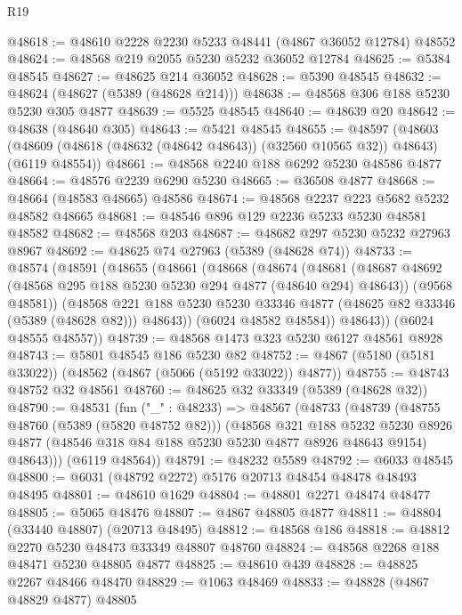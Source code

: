 \begin{lexlean}{R19}
\begin{coremodule}
@48618 := @48610 @2228 @2230 @5233 @48441 (@4867 @36052 @12784) @48552
@48624 := @48568 @219 @2055 @5230 @5232 @36052 @12784
@48625 := @5384 @48545
@48627 := @48625 @214 @36052
@48628 := @5390 @48545
@48632 := @48624 (@48627 (@5389 (@48628 @214)))
@48638 := @48568 @306 @188 @5230 @5230 @305 @4877
@48639 := @5525 @48545
@48640 := @48639 @20
@48642 := @48638 (@48640 @305)
@48643 := @5421 @48545
@48655 := @48597
    (@48603 (@48609 (@48618 (@48632 (@48642 @48643)) (@32560 @10565 @32)) @48643) (@6119 @48554))
@48661 := @48568 @2240 @188 @6292 @5230 @48586 @4877
@48664 := @48576 @2239 @6290 @5230
@48665 := @36508 @4877
@48668 := @48664 (@48583 @48665) @48586
@48674 := @48568 @2237 @223 @5682 @5232 @48582 @48665
@48681 := @48546 @896 @129 @2236 @5233 @5230 @48581 @48582
@48682 := @48568 @203
@48687 := @48682 @297 @5230 @5232 @27963 @8967
@48692 := @48625 @74 @27963 (@5389 (@48628 @74))
@48733 := @48574
    (@48591
      (@48655
        (@48661
          (@48668
            (@48674
              (@48681
                (@48687 @48692 (@48568 @295 @188 @5230 @5230 @294 @4877 (@48640 @294) @48643))
                (@9568 @48581))
              (@48568
                @221
                @188
                @5230
                @5230
                @33346
                @4877
                (@48625 @82 @33346 (@5389 (@48628 @82)))
                @48643))
            (@6024 @48582 @48584))
          @48643))
      (@6024 @48555 @48557))
@48739 := @48568 @1473 @323 @5230 @6127 @48561 @8928
@48743 := @5801 @48545 @186 @5230 @82
@48752 := @4867 (@5180 (@5181 @33022)) (@48562 (@4867 (@5066 (@5192 @33022)) @4877))
@48755 := @48743 @48752 @32 @48561
@48760 := @48625 @32 @33349 (@5389 (@48628 @32))
@48790 := @48531
    (fun ("_" : @48233) =>
    @48567
      (@48733
        (@48739
          (@48755 @48760 (@5389 (@5820 @48752 @82)))
          (@48568
            @321
            @188
            @5232
            @5230
            @8926
            @4877
            (@48546 @318 @84 @188 @5230 @5230 @4877 @8926 @48643 @9154)
            @48643)))
      (@6119 @48564))
@48791 := @48232 @5589
@48792 := @6033 @48545
@48800 := @6031 (@48792 @2272) @5176 @20713 @48454 @48478 @48493 @48495
@48801 := @48610 @1629
@48804 := @48801 @2271 @48474 @48477
@48805 := @5065 @48476
@48807 := @4867 @48805 @4877
@48811 := @48804 (@33440 @48807) (@20713 @48495)
@48812 := @48568 @186
@48818 := @48812 @2270 @5230 @48473 @33349 @48807 @48760
@48824 := @48568 @2268 @188 @48471 @5230 @48805 @4877
@48825 := @48610 @439
@48828 := @48825 @2267 @48466 @48470
@48829 := @1063 @48469
@48833 := @48828 (@4867 @48829 @4877) @48805

\end{coremodule}
\end{lexlean}
